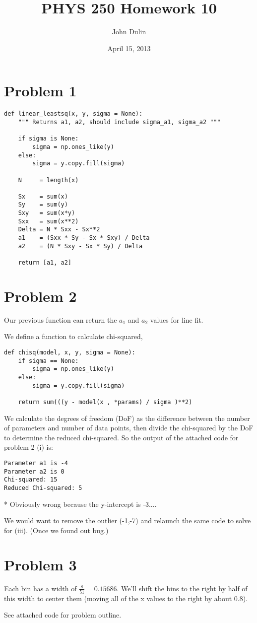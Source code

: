 \documentclass[12pt,a4paper,notitlepage]{article}
\title{PHYS 250 Homework 10}
\author{John Dulin}
\date{April 15, 2013}
\begin{document}
\maketitle

\section*{Problem 1}
\begin{verbatim}
def linear_leastsq(x, y, sigma = None):
    """ Returns a1, a2, should include sigma_a1, sigma_a2 """
    
    if sigma is None:
        sigma = np.ones_like(y)
    else:
        sigma = y.copy.fill(sigma)

    N     = length(x)

    Sx    = sum(x)
    Sy    = sum(y)
    Sxy   = sum(x*y)
    Sxx   = sum(x**2)
    Delta = N * Sxx - Sx**2
    a1    = (Sxx * Sy - Sx * Sxy) / Delta
    a2    = (N * Sxy - Sx * Sy) / Delta

    return [a1, a2]
\end{verbatim}

\section*{Problem 2}

Our previous function can return the $a_{1}$ and $a_{2}$ values for line fit.

We define a function to calculate chi-squared,

\begin{verbatim}
def chisq(model, x, y, sigma = None):
    if sigma == None:
        sigma = np.ones_like(y)
    else:
        sigma = y.copy.fill(sigma)

    return sum(((y - model(x , *params) / sigma )**2)
\end{verbatim}

We calculate the degrees of freedom (DoF) as the difference between the number of parameters and number of data points, then divide the chi-squared by the DoF to determine the reduced chi-squared.  So the output of the attached code for problem 2 (i) is:
\begin{verbatim}
Parameter a1 is -4
Parameter a2 is 0
Chi-squared: 15
Reduced Chi-squared: 5
\end{verbatim}
* Obviously wrong because the y-intercept is -3....

We would want to remove the outlier (-1,-7) and relaunch the same code to solve for (iii). (Once we found out bug.)


\section*{Problem 3}

Each bin has a width of $\frac{8}{51}=0.15686$.  We'll shift the bins to the right by half of this width to center them (moving all of the x values to the right by about 0.8).

See attached code for problem outline.
\end{document}
